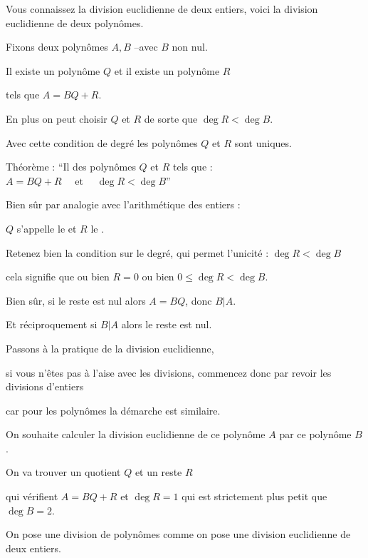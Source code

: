\diapo

Vous connaissez la division euclidienne de deux entiers, voici la division 
euclidienne de deux polynômes.

Fixons deux polynômes $A,B$ --avec $B$ non nul.

Il existe un polynôme $Q$ et il existe un polynôme $R$

tels que $A=BQ+R$.

En plus on peut choisir $Q$ et $R$ de sorte que $\deg R < \deg B$.

Avec cette condition de degré les polynômes $Q$ et $R$ sont uniques.

Théorème : ``Il  des polynômes $Q$ et $R$  tels que :
$A=BQ+R \quad \text{ et } \quad \deg R < \deg B$''

\change

Bien sûr par analogie avec l'arithmétique des entiers :

$Q$ s'appelle le  et $R$ le .

\change

Retenez bien la condition sur le degré, qui permet l'unicité :
$\deg R < \deg B$

cela signifie que ou bien $R=0$
ou bien $0 \le \deg R < \deg B$.

\change

Bien sûr, si le reste est nul alors $A=BQ$,
donc $B|A$.

Et réciproquement si $B|A$ alors le reste est nul.


\diapo


Passons à la pratique de la division euclidienne,

si vous n'êtes pas à l'aise avec les divisions, commencez donc par revoir les divisions d'entiers

car pour les polynômes la démarche est similaire.

On souhaite calculer la division euclidienne de ce polynôme $A$ par ce polynôme $B$.

\change


On va trouver un quotient $Q$ et un reste $R$


\change

qui vérifient $A=BQ+R$ et $\deg R = 1$ qui est strictement plus petit que $\deg B=2$.


\change

On pose une division de polynômes comme on pose une division euclidienne de deux entiers.

